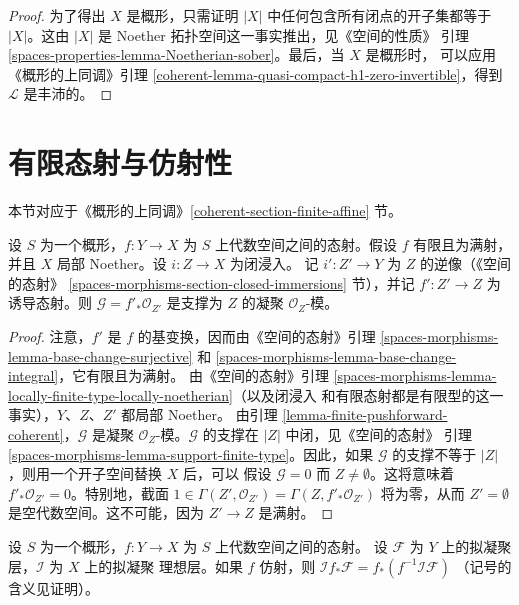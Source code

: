 \begin{proof}
\medskip\noindent
为了得出 $X$ 是概形，只需证明 $|X|$ 中任何包含所有闭点的开子集都等于
$|X|$。这由 $|X|$ 是 Noether 拓扑空间这一事实推出，见《空间的性质》
引理 \ref{spaces-properties-lemma-Noetherian-sober}。最后，当 $X$ 是概形时，
可以应用《概形的上同调》引理
\ref{coherent-lemma-quasi-compact-h1-zero-invertible}，得到
$\mathcal{L}$ 是丰沛的。
\end{proof}









\section{有限态射与仿射性}
\label{section-finite-affine}

\noindent
本节对应于《概形的上同调》\ref{coherent-section-finite-affine} 节。

\begin{lemma}
\label{lemma-finite-morphism-Noetherian}
设 $S$ 为一个概形，$f : Y \to X$ 为 $S$ 上代数空间之间的态射。假设
$f$ 有限且为满射，并且 $X$ 局部 Noether。设 $i : Z \to X$ 为闭浸入。
记 $i' : Z' \to Y$ 为 $Z$ 的逆像（《空间的态射》
\ref{spaces-morphisms-section-closed-immersions} 节），并记
$f' : Z' \to Z$ 为诱导态射。则
$\mathcal{G} = f'_*\mathcal{O}_{Z'}$ 是支撑为 $Z$ 的凝聚
$\mathcal{O}_Z$-模。
\end{lemma}

\begin{proof}
注意，$f'$ 是 $f$ 的基变换，因而由《空间的态射》引理
\ref{spaces-morphisms-lemma-base-change-surjective} 和
\ref{spaces-morphisms-lemma-base-change-integral}，它有限且为满射。
由《空间的态射》引理
\ref{spaces-morphisms-lemma-locally-finite-type-locally-noetherian}（以及闭浸入
和有限态射都是有限型的这一事实），$Y$、$Z$、$Z'$ 都局部 Noether。
由引理 \ref{lemma-finite-pushforward-coherent}，$\mathcal{G}$ 是凝聚
$\mathcal{O}_Z$-模。$\mathcal{G}$ 的支撑在 $|Z|$ 中闭，见《空间的态射》
引理 \ref{spaces-morphisms-lemma-support-finite-type}。因此，如果
$\mathcal{G}$ 的支撑不等于 $|Z|$，则用一个开子空间替换 $X$ 后，可以
假设 $\mathcal{G} = 0$ 而 $Z \not = \emptyset$。这将意味着
$f'_*\mathcal{O}_{Z'} = 0$。特别地，截面
$1 \in \Gamma(Z', \mathcal{O}_{Z'}) = \Gamma(Z, f'_*\mathcal{O}_{Z'})$
将为零，从而 $Z' = \emptyset$ 是空代数空间。这不可能，因为
$Z' \to Z$ 是满射。
\end{proof}

\begin{lemma}
\label{lemma-affine-morphism-projection-ideal}
设 $S$ 为一个概形，$f : Y \to X$ 为 $S$ 上代数空间之间的态射。
设 $\mathcal{F}$ 为 $Y$ 上的拟凝聚层，$\mathcal{I}$ 为 $X$ 上的拟凝聚
理想层。如果 $f$ 仿射，则
$\mathcal{I}f_*\mathcal{F} = f_*(f^{-1}\mathcal{I}\mathcal{F})$
（记号的含义见证明）。
\end{lemma}

